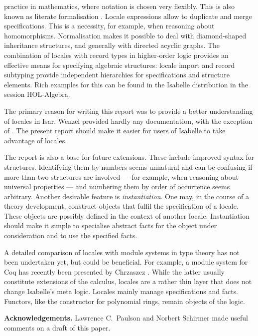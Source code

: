 \begin{isabellebody}
\begin{isamarkuptext}
  practice in mathematics, where notation is chosen very flexibly.
  This is also known as literate formalisation \cite{Bailey1998}.
  Locale expressions allow to duplicate and merge
  specifications.  This is a necessity, for example, when reasoning about
  homomorphisms.  Normalisation makes it possible to deal with
  diamond-shaped inheritance structures, and generally with directed
  acyclic graphs.  The combination of locales with record
  types in higher-order logic provides an effective means for
  specifying algebraic structures: locale import and record subtyping
  provide independent hierarchies for specifications and structure
  elements.  Rich examples for this can be found in
  the Isabelle distribution in the session HOL-Algebra.

  The primary reason for writing this report was to provide a better
  understanding of locales in Isar.  Wenzel provided hardly any
  documentation, with the exception of \cite{Wenzel2002b}.  The
  present report should make it easier for users of Isabelle to take
  advantage of locales.

  The report is also a base for future extensions.  These include
  improved syntax for structures.  Identifying them by numbers seems
  unnatural and can be confusing if more than two structures are
  involved --- for example, when reasoning about universal
  properties --- and numbering them by order of occurrence seems
  arbitrary.  Another desirable feature is \emph{instantiation}.  One
  may, in the course of a theory development, construct objects that
  fulfil the specification of a locale.  These objects are possibly
  defined in the context of another locale.  Instantiation should make it
  simple to specialise abstract facts for the object under
  consideration and to use the specified facts.

  A detailed comparison of locales with module systems in type theory
  has not been undertaken yet, but could be beneficial.  For example,
  a module system for Coq has recently been presented by Chrzaszcz
  \cite{Chrzaszcz2003,Chrzaszcz2004}.  While the
  latter usually constitute extensions of the calculus, locales are
  a rather thin layer that does not change Isabelle's meta logic.
  Locales mainly manage specifications and facts.  Functors, like
  the constructor for polynomial rings, remain objects of the
  logic.

  \textbf{Acknowledgements.}  Lawrence C.\ Paulson and Norbert
  Schirmer made useful comments on a draft of this paper.%
\end{isamarkuptext}%
%
\isadelimtheory
%
\endisadelimtheory
%
\isatagtheory
%
\endisatagtheory
{\isafoldtheory}%
%
\isadelimtheory
%
\endisadelimtheory
\end{isabellebody}%
